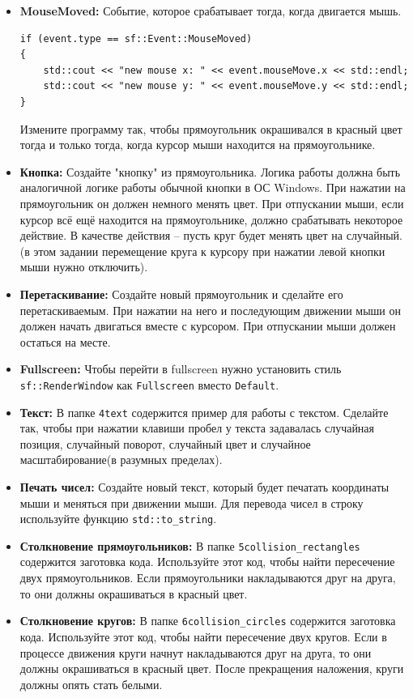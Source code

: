 \documentclass{article}
\begin{document}
\begin{itemize}
\item \textbf{MouseMoved:} Событие, которое срабатывает тогда, когда двигается мышь.
\begin{lstlisting}
if (event.type == sf::Event::MouseMoved)
{
    std::cout << "new mouse x: " << event.mouseMove.x << std::endl;
    std::cout << "new mouse y: " << event.mouseMove.y << std::endl;
}
\end{lstlisting}
Измените программу так, чтобы прямоугольник окрашивался в красный цвет тогда и только тогда, когда курсор мыши находится на прямоугольнике.
\item \textbf{Кнопка:} Создайте "кнопку" из прямоугольника. Логика работы должна быть аналогичной логике работы обычной кнопки в ОС Windows. При нажатии на прямоугольник он должен немного менять цвет. При отпускании мыши, если курсор всё ещё находится на прямоугольнике, должно срабатывать некоторое действие. В качестве действия -- пусть круг будет менять цвет на случайный. (в этом задании перемещение круга к курсору при нажатии левой кнопки мыши нужно отключить).
\item \textbf{Перетаскивание:} Создайте новый прямоугольник и сделайте его перетаскиваемым. При нажатии на него и последующим движении мыши он должен начать двигаться вместе с курсором. При отпускании мыши должен остаться на месте.
\item \textbf{Fullscreen:} Чтобы перейти в fullscreen нужно установить стиль \texttt{sf::RenderWindow} как \texttt{Fullscreen} вместо \texttt{Default}.
\item \textbf{Текст:} В папке \texttt{4text} содержится пример для работы с текстом. Сделайте так, чтобы при нажатии клавиши пробел у текста задавалась случайная позиция, случайный поворот, случайный цвет и случайное масштабирование(в разумных пределах).
\item \textbf{Печать чисел:} Создайте новый текст, который будет печатать координаты мыши и меняться при движении мыши. Для перевода чисел в строку используйте функцию \texttt{std::to\_string}.
\item \textbf{Столкновение прямоугольников:} В папке \texttt{5collision\_rectangles} содержится заготовка кода. Используйте этот код, чтобы найти пересечение двух прямоугольников. Если прямоугольники накладываются друг на друга, то они должны окрашиваться в красный цвет.
\item \textbf{Столкновение кругов:} В папке \texttt{6collision\_circles} содержится заготовка кода. Используйте этот код, чтобы найти пересечение двух кругов. Если в процессе движения круги начнут накладываются друг на друга, то они должны окрашиваться в красный цвет. После прекращения наложения, круги должны опять стать белыми.

\end{itemize}
\end{document}
